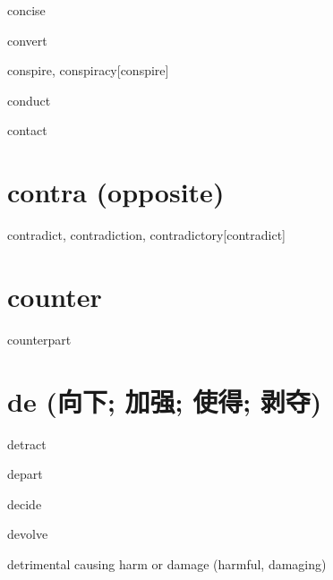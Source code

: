 \begin{RefWord}{concise}
\end{RefWord}

\begin{RefWord}{convert}
\end{RefWord}

\begin{RefWord}{conspire, conspiracy}[conspire]
\end{RefWord}

\begin{RefWord}{conduct}
\end{RefWord}

\begin{RefWord}{contact}
\end{RefWord}

\section{contra (opposite)}

\begin{RefWord}{contradict, contradiction, contradictory}[contradict]
\end{RefWord}

\section{counter}

\begin{RefWord}{counterpart}
\end{RefWord}

\section{de (向下; 加强; 使得; 剥夺)}

\begin{RefWord}{detract}
\end{RefWord}

\begin{RefWord}{depart}
\end{RefWord}

\begin{RefWord}{decide}
\end{RefWord}

\begin{RefWord}{devolve}
\end{RefWord}

\begin{RefWord}{detrimental}
    causing harm or damage (harmful, damaging)
\end{RefWord}

